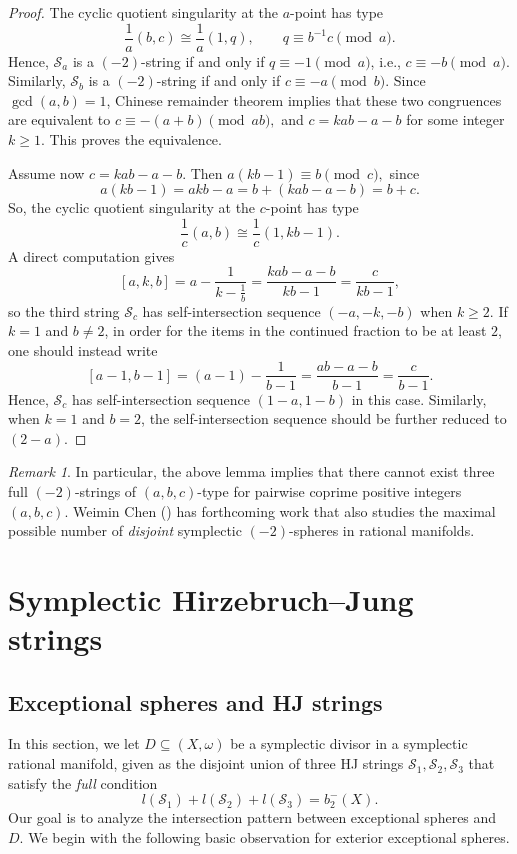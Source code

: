 \documentclass[11pt]{article}
\theoremstyle{definition}
\theoremstyle{remark}
\newtheorem{remark}[theorem]{Remark}
\newcommand{\st}{\mathcal{S}}
\begin{document}
\begin{proof}
The cyclic quotient singularity at the $a$-point has type
\[
\frac{1}{a}(b,c)\cong \frac{1}{a}(1,q), \qquad q\equiv b^{-1}c \pmod a.
\]
Hence, $\st_a$ is a $(-2)$-string if and only if $q\equiv -1 \pmod a$, i.e., $c\equiv -b \pmod a$.
Similarly, $\st_b$ is a $(-2)$-string if and only if
$c\equiv -a \pmod b$.
Since $\gcd(a,b)=1$, Chinese remainder theorem implies that these two congruences are equivalent to
\(
c\equiv -(a+b)\pmod{ab},
\)
and
\(
c=kab-a-b
\)
for some integer $k\ge 1$. This proves the equivalence.

Assume now $c=kab-a-b$. Then \(
a(kb-1)\equiv b \pmod c,
\)
since
\[
a(kb-1)=akb-a=b+(kab-a-b)=b+c.
\]
So, the cyclic quotient singularity at the $c$-point has type
\[
\frac{1}{c}(a,b)\cong \frac{1}{c}(1,kb-1).
\]
A direct computation gives
\[
[a,k,b]
=
a-\frac{1}{k-\frac{1}{b}}
=
\frac{kab-a-b}{kb-1}
=
\frac{c}{kb-1},
\]
so the third string $\st_c$ has self-intersection sequence $(-a,-k,-b)$ when $k\geq 2$. If $k=1$ and $b\neq 2$, in order for the items in the continued fraction to be at least $2$, one should instead write
\[[a-1,b-1]=(a-1)-\frac{1}{b-1}=\frac{ab-a-b}{b-1}=\frac{c}{b-1}.\]
Hence, $\st_c$ has self-intersection sequence $(1-a,1-b)$ in this case. Similarly, when $k=1$ and $b=2$, the self-intersection sequence should be further reduced to $(2-a)$.
\end{proof}

\begin{remark}
  In particular, the above lemma implies that there cannot exist three full $(-2)$-strings of $(a,b,c)$-type for pairwise coprime positive integers $(a,b,c)$. Weimin Chen (\cite{Chentalk}) has forthcoming work that also studies the maximal possible number of \emph{disjoint} symplectic $(-2)$-spheres in rational manifolds.
\end{remark}


\section{Symplectic Hirzebruch--Jung strings}\label{Section:HJstrings}

\subsection{Exceptional spheres and HJ strings}\label{section:HJnontoric}
In this section, we let $D\subseteq (X,\omega)$ be a symplectic divisor in a symplectic rational manifold, given as the disjoint union of three HJ strings $\st_1,\st_2,\st_3$ that satisfy the \emph{full} condition
\[
  l(\st_1)+l(\st_2)+l(\st_3)=b_2^-(X).
\]
Our goal is to analyze the intersection pattern between exceptional spheres and $D$. We begin with the following basic observation for exterior exceptional spheres.
\end{document}
